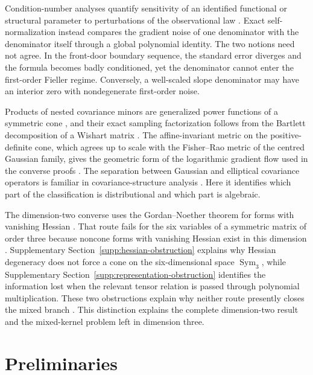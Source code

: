\documentclass[12pt,a4paper]{article}
\theoremstyle{plain}
\theoremstyle{definition}
\newcommand{\Sym}{\operatorname{Sym}}
\begin{document}
Condition-number analyses quantify sensitivity of an identified functional or structural parameter to perturbations of the observational law \citep{schulman2016,gordon2021,sankararaman2022}.
Exact self-normalization instead compares the gradient noise of one denominator with the denominator itself through a global polynomial identity.
The two notions need not agree.
In the front-door boundary sequence, the standard error diverges and the formula becomes badly conditioned, yet the denominator cannot enter the first-order Fieller regime.
Conversely, a well-scaled slope denominator may have an interior zero with nondegenerate first-order noise.

Products of nested covariance minors are generalized power functions of a symmetric cone \citep{farautkoranyi1994}, and their exact sampling factorization follows from the Bartlett decomposition of a Wishart matrix \citep{muirhead1982}.
The affine-invariant metric on the positive-definite cone, which agrees up to scale with the Fisher--Rao metric of the centred Gaussian family, gives the geometric form of the logarithmic gradient flow used in the converse proofs \citep{bhatia2007}.
The separation between Gaussian and elliptical covariance operators is familiar in covariance-structure analysis \citep{shapirobrowne1987,iwashitasiotani1994}.
Here it identifies which part of the classification is distributional and which part is algebraic.

The dimension-two converse uses the Gordan--Noether theorem for forms with vanishing Hessian \citep{gordannoether1876,lossen2004}.
That route fails for the six variables of a symmetric matrix of order three because noncone forms with vanishing Hessian exist in this dimension \citep{perazzo1900,ciliberto2008,gondimrusso2015}.
Supplementary Section~\ref{supp:hessian-obstruction} explains why Hessian degeneracy does not force a cone on the six-dimensional space $\Sym_3$, while Supplementary Section~\ref{supp:representation-obstruction} identifies the information lost when the relevant tensor relation is passed through polynomial multiplication.
These two obstructions explain why neither route presently closes the mixed branch \citep{lichtenstein1982}.
This distinction explains the complete dimension-two result and the mixed-kernel problem left in dimension three.

\section{Preliminaries}
\label{sec:prelim}
\end{document}
